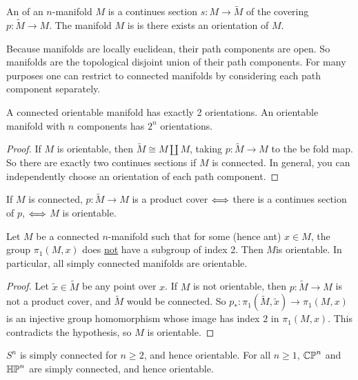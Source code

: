 \documentclass[a4paper,11pt,english]{article}
\def\tM{\widetilde{M}}
\begin{document}
\begin{defn}
An  of an $n$-manifold $M$ is a continues section $s: M \to
\tM$ of the covering $p: \tM \to M$. The manifold $M$ is  is
there exists an orientation of $M$.
\end{defn}

\begin{remark}
Because manifolds are locally euclidean, their path components are open. So
manifolds are the topological disjoint union of their path components. For many
purposes one can restrict to connected manifolds by considering each path
component separately.
\end{remark}

\begin{corol}
A connected orientable manifold has exactly 2 orientations. An orientable
manifold with $n$ components has $2^n$ orientations.
\end{corol}

\begin{proof}
If $M$ is orientable, then $\tM \cong M\coprod M$, taking $p : \tM \to M$ to the
be fold map. So there are exactly two continues sections if $M$ is connected. In
general, you can independently choose an orientation of each path component.
\end{proof}

\begin{note}
If $M$ is connected, $p: \tM \to M$ is a product cover $\Longleftrightarrow$ there is a continues
section of $p$, $\Longleftrightarrow$ $M$ is orientable.
\end{note}

\begin{corol}
Let $M$ be a connected $n$-manifold such that for some (hence ant) $x\in M$, the
group $\pi_1(M, x)$ does \underline{not} have a subgroup of index 2. Then $M$is
orientable. In particular, all simply connected manifolds are orientable.
\end{corol}

\begin{proof}
Let $\tilde{x} \in \tM$ be any point over $x$. If $M$ is not orientable, then
$p:\tM \to M$ is not a product cover, and $\tM$ would be connected. So
$p_* : \pi_1(\tM,\tilde{x}) \to \pi_1(M,x)$ is an injective group homomorphism
whose image has index $2$ in $\pi_1(M,x)$. This contradicts the hypothesis, so
$M$ is orientable.
\end{proof}

\begin{exmp}
$S^n$ is simply connected for $n \ge 2$, and hence orientable. For all $n\ge 1$,
$\mathbb{CP}^n$ and $\mathbb{HP}^n$ are simply connected, and hence orientable.
\end{exmp}
\end{document}
